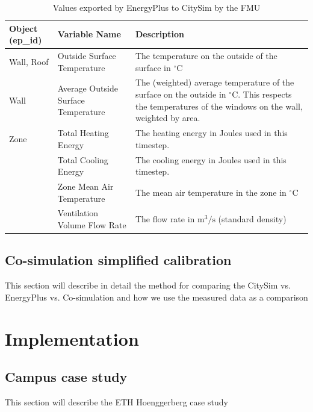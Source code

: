 \documentclass{tBPS2e}
\theoremstyle{plain}
\theoremstyle{definition}
\theoremstyle{remark}
\begin{document}
\begin{table}
\caption{Values exported by EnergyPlus to CitySim by the FMU}
\label{tab:FMUexports}
\centering
\begin{tabular}{|p{1.3cm}|p{1.9cm}|p{3.2cm}|}
  \hline
  \bf{Object (ep\_id)} &  \bf{Variable Name} & \bf{Description} \\
    \hline
Wall, Roof & Outside Surface Temperature & The temperature on the outside of the surface in $^{\circ}\mathrm{C}$ \\    
    \hline
Wall & Average Outside Surface Temperature & The (weighted) average temperature of the surface on the outside in $^{\circ}\mathrm{C}$. This respects the temperatures of the windows on the wall, weighted by area. \\
    \hline
Zone & Total Heating Energy & The heating energy in Joules used in this timestep. \\
    \hline
 & Total Cooling Energy & The cooling energy in Joules used in this timestep. \\
    \hline
 & Zone Mean Air Temperature & The mean air temperature in the zone in $^{\circ}\mathrm{C}$ \\
    \hline
 & Ventilation Volume Flow Rate & The flow rate in $\mathrm{m}^3/\mathrm{s}$ (standard density) \\
    \hline
\end{tabular}
\end{table}

\subsection{Co-simulation simplified calibration}

{\color{red}This section will describe in detail the method for comparing the CitySim vs. EnergyPlus vs. Co-simulation and how we use the measured data as a comparison}

\section{Implementation}
\subsection{Campus case study}
{\color{red}This section will describe the ETH Hoenggerberg case study}

\end{document}
